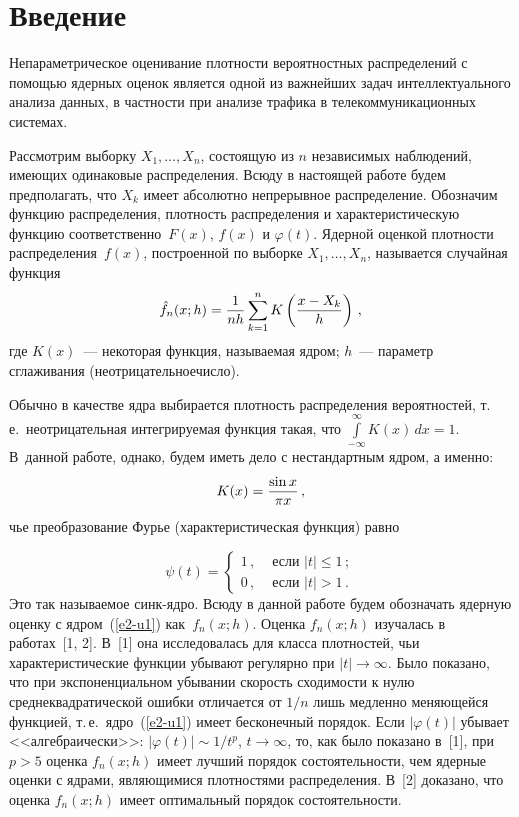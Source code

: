       \begin{multicols}{2}
      
            \label{st\stat}

\section{Введение}

Непараметрическое оценивание плотности вероятностных распределений с помощью 
ядерных оценок является одной из важнейших задач интеллектуального
анализа данных, в частности при анализе трафика в телекоммуникационных системах.

Рассмотрим выборку $X_1,\ldots,X_n$, состоящую из $n$ независимых наблюдений,
имеющих одинаковые распределения. Всюду в настоящей работе будем
предполагать, что $X_k$ имеет абсолютно непрерывное распределение.
Обозначим функцию распределения, плотность распределения и характеристическую
функцию соответственно~$F(x)$, $f(x)$ и $\varphi(t)$. Ядерной оценкой
плотности распределения~$f(x)$, построенной по выборке $X_1,\ldots,X_n$,
называется случайная функция
\begin{equation*}
\hat f_n(x;h)=\displaystyle\frac{\displaystyle 1\mathstrut}{\displaystyle nh\mathstrut}\sum\limits_{k=1}^nK\left(\displaystyle\frac{\displaystyle x-X_k\mathstrut}{\displaystyle h\mathstrut}\right)\,,
\end{equation*}
где $K(x)$~--- некоторая функция, называемая \mbox{ядром}; $h$~--- параметр
сглаживания (неотрицательное\linebreak чис\-ло).

Обычно в качестве ядра выбирается плотность распределения вероятностей, т.\,е.\
неотрицательная интегрируемая функция такая, что
$\int\limits_{-\infty}^\infty K(x)\,dx=1$. В~данной работе, однако, будем иметь дело
с нестандартным ядром, а именно:
\begin{equation}
K(x)=\displaystyle\frac{\displaystyle \sin x\mathstrut}{\displaystyle \pi x\mathstrut}\,,
\label{e2-u1}
\end{equation}
чье преобразование Фурье (характеристическая функция) равно

\noindent
$$
\psi(t)=\begin{cases}
1\,,& \mbox{\ если\ } |t|\le 1\,;\\
0\,,& \mbox{\ если\ } |t|>1\,.
\end{cases}
$$
Это так называемое синк-ядро. Всюду в данной работе будем обозначать ядерную оценку с
ядром~(\ref{e2-u1}) как~$f_n(x;h)$. Оценка $f_n(x;h)$ изучалась в работах~[1, 2]. 
В~[1] она исследовалась для класса плотностей, чьи
характеристические функции убывают регулярно при $|t|\to\infty$.
Было показано, что при экспоненциальном убывании скорость сходимости
к нулю среднеквадратической ошибки отличается от $1/n$ лишь медленно
меняющейся функцией, т.\,е.\ ядро~(\ref{e2-u1}) имеет бесконечный порядок. Если
$|\varphi(t)|$ убывает <<алгебраически>>: $|\varphi(t)|\sim
1/{t^p}$, $t\to\infty$, то, как было показано в~[1], при $p>5$
оценка $f_n(x;h)$ имеет лучший порядок состоятельности, чем ядерные
оценки с ядрами, являющимися плотностями распределения. В~[2]
доказано, что оценка $f_n(x;h)$ имеет оптимальный порядок состоятельности.


\end{multicols}
